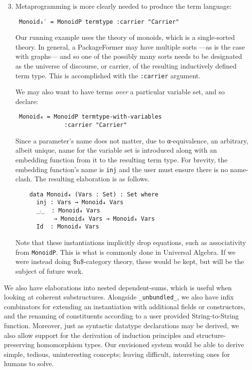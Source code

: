 \documentclass[sigplan,screen]{acmart}
\begin{document}
\begin{enumerate}
\setcounter{enumi}{2}
\item Metaprogramming is more clearly needed to produce the term language:
\vspace{0.3em}
\begin{verbatim}
 Monoid₃′ = MonoidP termtype :carrier "Carrier"
\end{verbatim}
 \vspace{0.3em}
\noindent
Our running example uses the theory of monoids, which is a single-sorted theory.
In general, a PackageFormer may have multiple sorts ---as is the case with
graphs--- and so one of the possibly many sorts needs to be designated as the
universe of discourse, or carrier, of the resulting inductively defined term type.
This is accomplished with the \texttt{:carrier} argument.

\vspace{0.3em}
\noindent
We may also want to have terms \emph{over} a particular variable set, and so declare:
\vspace{0.3em}
\begin{verbatim}
 Monoid₄ = MonoidP termtype-with-variables
              :carrier "Carrier"
\end{verbatim}
\vspace{0.3em}
\noindent
Since a parameter's name does not matter, due to α-equivalence, an arbitrary,
albeit unique, name for the variable set is introduced along with an embedding
function from it to the resulting term type. For brevity, the embedding function's
name is \texttt{inj} and the user must ensure there is no name-clash.
The resulting elaboration is as follows.
   \vspace{0.3em}
   \noindent
\begin{verbatim}
    data Monoid₄ (Vars : Set) : Set where
      inj : Vars → Monoid₄ Vars
      _⨾_  : Monoid₄ Vars
           → Monoid₄ Vars → Monoid₄ Vars
      Id  : Monoid₄ Vars
\end{verbatim}

\vspace{0.3em}
\noindent
Note that these instantiations implicitly drop equations, such
as associativity from \texttt{MonoidP}.  This is what is commonly done
in Universal Algebra. If we were instead doing \$n\$-category
theory, these would be kept, but will be the subject of future
work.
\end{enumerate}

We also have elaborations into nested dependent-sums, which is useful
when looking at coherent substructures.
Alongside \texttt{\_unbundled\_}, we also have infix combinators for extending an
instantiation with additional fields or constructors, and the renaming of constituents
according to a user provided String-to-String function.
Moreover, just as syntactic datatype declarations may be derived, we also
allow support for the derivation of induction principles and structure-preserving homomorphism types.
Our envisioned system would be able to derive simple, tedious, uninteresting concepts; leaving difficult,
interesting ones for humans to solve.
\end{document}
